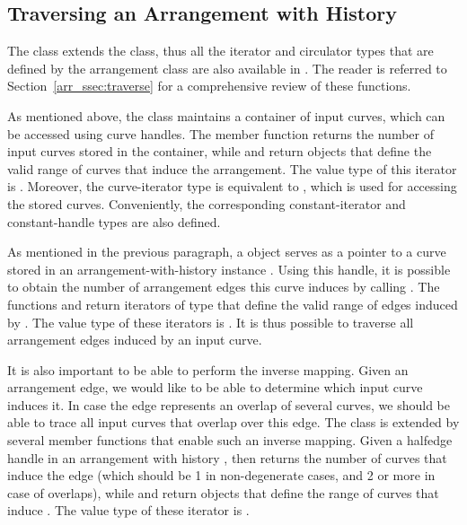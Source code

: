 \subsection{Traversing an Arrangement with History}
\label{arr_ssec:arrwh_traverse}
%
The  class extends the 
class, thus all the iterator and circulator types that are defined by the
arrangement class are also available in .
The reader is referred to Section~\ref{arr_ssec:traverse} for a comprehensive
review of these functions.

As mentioned above, the  class maintains
a container of input curves, which can be accessed using curve handles.
The member function  returns the number of input 
curves stored in the container, while  and 
 return 
objects that define the  valid range of curves that induce the arrangement.
The value type of this iterator is . Moreover, the curve-iterator
type is equivalent to  , which
is used for accessing the stored curves. Conveniently, the corresponding
constant-iterator and constant-handle types are also defined.

As mentioned in the previous paragraph, a  object  
serves as a pointer to a curve stored in an arrangement-with-history instance 
. Using this handle, it is possible to obtain the number of 
arrangement edges this curve induces by calling 
. The functions 
 and
 return iterators of type
 that define the
valid range of edges induced by . The value type of these iterators
is . It is thus possible to traverse all arrangement
edges induced by an input curve.

It is also important to be able to perform the inverse mapping. Given an
arrangement edge, we would like to be able to determine which input curve
induces it. In case the edge represents an overlap of several curves, we
should be able to trace all input curves that overlap over this edge.
The  class is extended by several member
functions that enable such an inverse mapping. Given a halfedge handle 
in an arrangement with history , then 
 returns the number of curves that
induce the edge (which should be 1 in non-degenerate cases, and 2 or more
in case of overlaps), while  and 
 return 
 objects that
define the range of curves that induce . The value type of these
iterator is .

